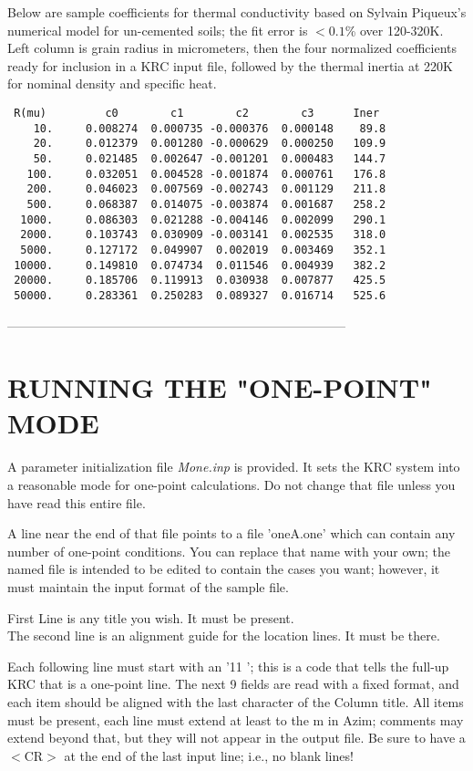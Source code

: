 \documentclass[draft]{article}  %
\newcommand{\nf}{\textit}  %
\begin{document}
Below are sample coefficients for thermal conductivity based on Sylvain
Piqueux's numerical model for un-cemented soils; the fit error is $<0.1$\% over
120-320K. Left column is grain radius in micrometers, then the four normalized
coefficients ready for inclusion in a KRC input file, followed by the thermal
inertia at 220K for nominal density and specific heat.
\vspace{-3.mm} 
\begin{verbatim}
 R(mu)         c0        c1        c2        c3      Iner  
    10.     0.008274  0.000735 -0.000376  0.000148    89.8 
    20.     0.012379  0.001280 -0.000629  0.000250   109.9 
    50.     0.021485  0.002647 -0.001201  0.000483   144.7 
   100.     0.032051  0.004528 -0.001874  0.000761   176.8 
   200.     0.046023  0.007569 -0.002743  0.001129   211.8 
   500.     0.068387  0.014075 -0.003874  0.001687   258.2 
  1000.     0.086303  0.021288 -0.004146  0.002099   290.1 
  2000.     0.103743  0.030909 -0.003141  0.002535   318.0 
  5000.     0.127172  0.049907  0.002019  0.003469   352.1 
 10000.     0.149810  0.074734  0.011546  0.004939   382.2 
 20000.     0.185706  0.119913  0.030938  0.007877   425.5 
 50000.     0.283361  0.250283  0.089327  0.016714   525.6 
\end{verbatim}


--------------------------------------------------------------------------------

 \section{RUNNING THE "ONE-POINT" MODE} %

A parameter initialization file   \nf{Mone.inp}  is provided. It sets the KRC 
system into a reasonable mode for one-point calculations. Do not change that 
file unless you have read this entire file.

A line near the end of that file points to a file 'oneA.one' which can contain
any number of one-point conditions. You can replace that name with your own; the
named file is intended to be edited to contain the cases you want; however, it
must maintain the input format of the sample file.

First Line is any title you wish. It must be present. \\
The second line is an alignment guide for the location lines. It must be there.

Each following line must start with an '11 '; this is a code that tells the
full-up KRC that is a one-point line. The next 9 fields are read with a fixed
format, and each item should be aligned with the last character of the Column
title. All items must be present, each line must extend at least to the m in
Azim; comments may extend beyond that, but they will not appear in the output
file. Be sure to have a $<$CR$>$ at the end of the last input line; i.e., no
blank lines!
\end{document}
